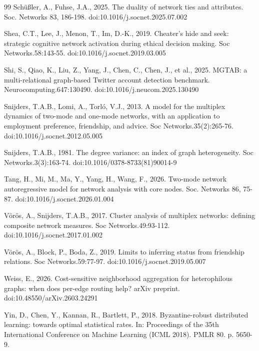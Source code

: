 \documentclass[preprint,12pt,authoryear]{elsarticle}
\theoremstyle{definition}
\begin{document}
\begin{thebibliography}{99}
Sch\"u{\ss}ler, A., Fuhse, J.A., 2025. The duality of network ties and attributes. Soc. Networks 83, 186-198. doi:10.1016/j.socnet.2025.07.002

Shea, C.T., Lee, J., Menon, T., Im, D.-K., 2019. Cheater's hide and seek: strategic cognitive network activation during ethical decision making. Soc Networks.58:143-55. doi:10.1016/j.socnet.2019.03.005

Shi, S., Qiao, K., Liu, Z., Yang, J., Chen, C., Chen, J., et al., 2025. MGTAB: a multi-relational graph-based Twitter account detection benchmark. Neurocomputing.647:130490. doi:10.1016/j.neucom.2025.130490

Snijders, T.A.B., Lomi, A., Torl\'o, V.J., 2013. A model for the multiplex dynamics of two-mode and one-mode networks, with an application to employment preference, friendship, and advice. Soc Networks.35(2):265-76. doi:10.1016/j.socnet.2012.05.005

Snijders, T.A.B., 1981. The degree variance: an index of graph heterogeneity. Soc Networks.3(3):163-74. doi:10.1016/0378-8733(81)90014-9

Tang, H., Mi, M., Ma, Y., Yang, H., Wang, F., 2026. Two-mode network autoregressive model for network analysis with core nodes. Soc. Networks 86, 75-87. doi:10.1016/j.socnet.2026.01.004

V\"or\"os, A., Snijders, T.A.B., 2017. Cluster analysis of multiplex networks: defining composite network measures. Soc Networks.49:93-112. doi:10.1016/j.socnet.2017.01.002

V\"or\"os, A., Block, P., Boda, Z., 2019. Limits to inferring status from friendship relations. Soc Networks.59:77-97. doi:10.1016/j.socnet.2019.05.007

Weiss, E., 2026. Cost-sensitive neighborhood aggregation for heterophilous graphs: when does per-edge routing help? arXiv preprint. doi:10.48550/arXiv.2603.24291

Yin, D., Chen, Y., Kannan, R., Bartlett, P., 2018. Byzantine-robust distributed learning: towards optimal statistical rates. In: Proceedings of the 35th International Conference on Machine Learning (ICML 2018). PMLR 80. p. 5650-9.


\end{thebibliography}
\end{document}
